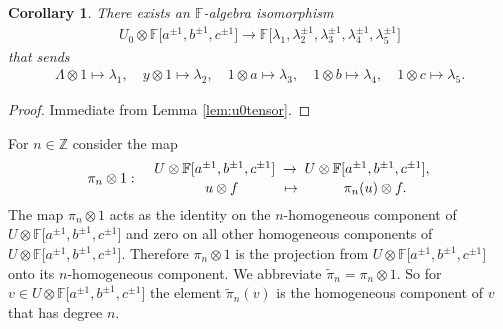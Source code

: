\documentclass[pdftex]{sigma}
\numberwithin{equation}{section}
\newtheorem{Corollary}[Theorem]{Corollary}
\begin{document}
\begin{Corollary}
\label{cor:polyalg}
There exists an $\mathbb F$-algebra isomorphism
\begin{gather*}
U_0 \otimes
\mathbb F \big\lbrack a^{\pm 1}, b^{\pm 1}, c^{\pm 1}\big\rbrack  \to
\mathbb F\big\lbrack \lambda_1,
\lambda_2^{\pm 1},
\lambda_3^{\pm 1},
\lambda_4^{\pm 1},
\lambda_5^{\pm 1} \big\rbrack
\end{gather*}
that sends
\begin{gather*}
\Lambda \otimes 1 \mapsto \lambda_1, \quad
y\otimes 1 \mapsto \lambda_2 ,\quad
1\otimes a \mapsto \lambda_3,
\quad
1\otimes b \mapsto \lambda_4,
\quad
1\otimes c \mapsto \lambda_5.
\end{gather*}
\end{Corollary}
\begin{proof}
Immediate from
Lemma
\ref{lem:u0tensor}.
\end{proof}

\begin{Definition}
\label{def:tildeproj}
\rm For $n \in \mathbb Z$  consider the
map
\begin{gather*}
\pi_n \otimes 1: \quad
\genfrac{}{}{0pt}{}{
U \otimes
\mathbb F \lbrack a^{\pm 1}, b^{\pm 1}, c^{\pm 1}\rbrack \; \to\;
U\otimes
\mathbb F \lbrack a^{\pm 1}, b^{\pm 1}, c^{\pm 1}\rbrack,
}
{\qquad  u \otimes f  \quad \qquad
\mapsto
\qquad \quad
\pi_n(u)\otimes f.}
\end{gather*}
The map
$\pi_n \otimes 1$
acts as the identity on the $n$-homogeneous component of
$U\otimes
\mathbb F \lbrack a^{\pm 1}, b^{\pm 1}, c^{\pm 1}\rbrack$
and  zero on all  other homogeneous components of
$U \otimes
\mathbb F \lbrack a^{\pm 1}, b^{\pm 1}, c^{\pm 1}\rbrack$.
Therefore
$\pi_n \otimes 1$ is the
projection from
$U\otimes
\mathbb F \lbrack a^{\pm 1}, b^{\pm 1}, c^{\pm 1}\rbrack$
onto its $n$-homogeneous component.
We abbreviate
$\tilde \pi_n =
\pi_n \otimes 1$.
So for $v \in
U \otimes
\mathbb F \lbrack a^{\pm 1}, b^{\pm 1}, c^{\pm 1}\rbrack$
the element
$\tilde \pi_n(v)$ is the homogeneous component of
$v$ that has degree $n$.
\end{Definition}
\end{document}
